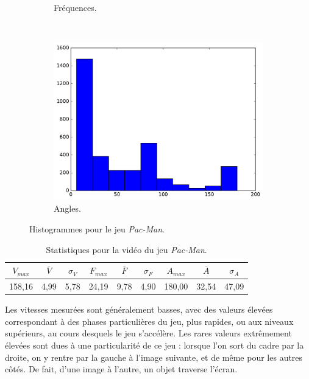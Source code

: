 \begin{figure}[!htbp]
\begin{subfigure}[t]{\subImgWclicks}
			\caption{Fréquences.}
			\label{fig:pacmannA_frequency}
		\end{subfigure}
		~
		\begin{subfigure}[t]{\subImgWclicks}
			\centering
			\includegraphics[width=\textwidth]{figures/ch3/pacmannA_angle}
			\caption{Angles.}
			\label{fig:pacmannA_angle}
		\end{subfigure}
		\caption[Histogrammes pour le jeu \emph{Pac-Man}]{Histogrammes pour le jeu \emph{Pac-Man}.}
		\label{fig:histPacmann}
	\end{figure}
	
\begin{table}
	\centering
	\begin{tabular}{c c c c c c c c c}
		$V_{max}$	& $\overline{V}$	& $\sigma_{V}$	& $F_{max}$	& $\overline{F}$	& $\sigma_{F}$	& $A_{max}$	& $\overline{A}$	& $\sigma_{A}$	\bigstrut[b] \\ \hline

		158,16		& 4,99				& 5,78			& 24,19		& 9,78				& 4,90			& 180,00	& 32,54				& 47,09			\bigstrut[t] \\
	\end{tabular}
	\caption[Statistiques pour la vidéo du jeu \emph{Pac-Man}]{Statistiques pour la vidéo du jeu \emph{Pac-Man}.}
	\label{tab:pacmannA_stats}
\end{table}

	Les vitesses mesurées sont généralement basses, avec des valeurs élevées correspondant à des phases particulières du jeu, plus rapides, ou aux niveaux supérieurs, au cours desquels le jeu s'accélère. Les rares valeurs extrêmement élevées sont dues à une particularité de ce jeu : lorsque l'on sort du cadre par la droite, on y rentre par la gauche à l'image suivante, et de même pour les autres côtés. De fait, d'une image à l'autre, un objet traverse l'écran.
	
